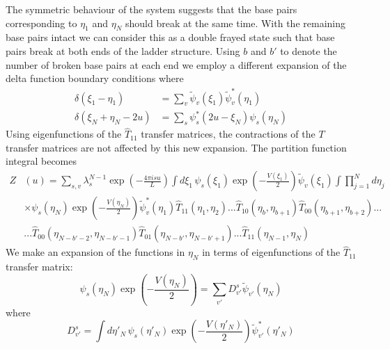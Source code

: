 The symmetric behaviour of the system suggests that the base pairs corresponding to $\eta_1$ and $\eta_N$ should break at the same time. With the remaining base pairs intact we can consider this as a double frayed state such that base pairs break at both ends of the ladder structure. Using $b$ and $b'$ to denote the number of broken base pairs at each end we employ a different expansion of the delta function boundary conditions where
%
\begin{align}
\label{df_dna_delta_1}
\delta\left(\xi_{1}-\eta_{1}\right)&=\sum_{v}\tilde{\psi}_{v}\left(\xi_{1}\right)\tilde{\psi}^{*}_{v}\left(\eta_{1}\right)\\
\label{df_dna_delta_2}
\delta\left(\xi_{N}+\eta_{N}-2u\right)&=\sum_{s}\psi^{*}_{s}\left(2u-\xi_{N}\right)\psi_{s}\left(\eta_{N}\right)
\end{align}
%
Using eigenfunctions of the $\hat{T}_{11}$ transfer matrices, the contractions of the $T$ transfer matrices are not affected by this new expansion. The partition function integral becomes
%
\begin{align}
\label{dna_dfray_1}
Z&\left(u\right)=\sum_{s,v}\lambda_{s}^{N-1}\exp\left(-\frac{4\pi isu}{L}\right)\int d\xi_{1}\,\psi_{s}\left(\xi_{1}\right)\exp\left(-\frac{V\left(\xi_{1}\right)}{2}\right)\tilde{\psi}_{v}\left(\xi_{1}\right)\int\prod_{j=1}^{N}d\eta_{j}\nonumber\\
&\times\psi_{s}\left(\eta_{N}\right)\exp\left(-\frac{V\left(\eta_{N}\right)}{2}\right)\tilde{\psi}^{*}_{v}\left(\eta_{1}\right)\hat{T}_{11}\left(\eta_{1},\eta_{2}\right)...\hat{T}_{10}\left(\eta_{b},\eta_{b+1}\right)\hat{T}_{00}\left(\eta_{b+1},\eta_{b+2}\right)...\nonumber\\
&...\hat{T}_{00}\left(\eta_{N-b'-2},\eta_{N-b'-1}\right)\hat{T}_{01}\left(\eta_{N-b'},\eta_{N-b'+1}\right)...\hat{T}_{11}\left(\eta_{N-1},\eta_{N}\right)
\end{align}
%
We make an expansion of the functions in $\eta_N$ in terms of eigenfunctions of the $\hat{T}_{11}$ transfer matrix:
%
\begin{equation}
\psi_{s}\left(\eta_{N}\right)\exp\left(-\frac{V\left(\eta_{N}\right)}{2}\right) = \sum_{v'}D^{s}_{v'}\tilde{\psi}_{v'}\left(\eta_{N}\right)
\end{equation}
%
where
%
\begin{equation}
\label{dna_d1_matrix}
D^{s}_{v'}=\int d\eta'_{N}\,\psi_{s}\left(\eta'_{N}\right)\exp\left(-\frac{V\left(\eta'_{N}\right)}{2}\right)\tilde{\psi}^{*}_{v'}\left(\eta'_{N}\right)
\end{equation}
